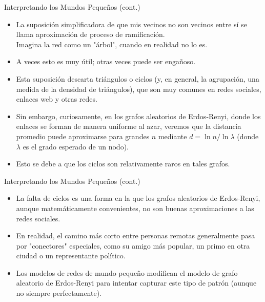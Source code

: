 \documentclass[11pt]{beamer}
\begin{document}
\begin{frame}{Interpretando los Mundos Pequeños (cont.)}
\begin{itemize}
  \item La suposición simplificadora de que mis vecinos no son vecinos entre sí se llama aproximación de proceso de ramificación.\\
  Imagina la red como un "árbol", cuando en realidad no lo es.
  \item A veces esto es muy útil; otras veces puede ser engañoso.
  \item Esta suposición descarta triángulos o ciclos (y, en general, la agrupación, una medida de la densidad de triángulos), que son muy comunes en redes sociales, enlaces web y otras redes.
  \item Sin embargo, curiosamente, en los grafos aleatorios de Erdos-Renyi, donde los enlaces se forman de manera uniforme al azar, veremos que la distancia promedio puede aproximarse para grandes $n$ mediante $d=\ln n / \ln \lambda$ (donde $\lambda$ es el grado esperado de un nodo).
  \item Esto se debe a que los ciclos son relativamente raros en tales grafos.
\end{itemize}
    
\end{frame}

\begin{frame}{Interpretando los Mundos Pequeños (cont.)}
\begin{itemize}
  \item La falta de ciclos es una forma en la que los grafos aleatorios de Erdos-Renyi, aunque matemáticamente convenientes, no son buenas aproximaciones a las redes sociales.
  \item En realidad, el camino más corto entre personas remotas generalmente pasa por "conectores" especiales, como su amigo más popular, un primo en otra ciudad o un representante político.
  \item Los modelos de redes de mundo pequeño modifican el modelo de grafo aleatorio de Erdos-Renyi para intentar capturar este tipo de patrón (aunque no siempre perfectamente).
\end{itemize}
    
\end{frame}
\end{document}
